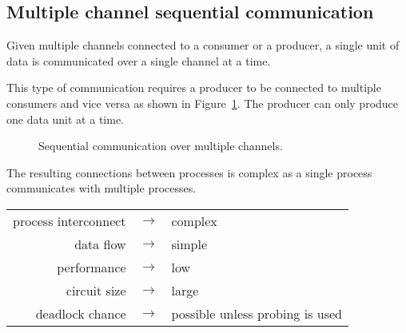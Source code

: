 \documentclass{report}
\begin{document}

\subsection{Multiple channel sequential communication}

Given multiple channels connected to a consumer or a producer, a single unit of
data is communicated over a single channel at a time.

This type of communication requires a producer to be connected to multiple
consumers and vice versa as shown in
Figure~\ref{fig:multi-channel-communication}. The producer can only produce one
data unit at a time.

\begin{figure}[H]
\centering
{}
\caption{Sequential communication over multiple channels.}\label{fig:multi-channel-communication}
\end{figure}

The resulting connections between processes is complex as a single process
communicates with multiple processes.

\begin{table}[H]
    \centering
    \begin{tabular}{r c l}
        process interconnect & $\rightarrow$ & complex \\
        data flow            & $\rightarrow$ & simple \\
        performance          & $\rightarrow$ & low \\
        circuit size         & $\rightarrow$ & large \\
        deadlock chance      & $\rightarrow$ & possible unless probing is used \\
    \end{tabular}
\end{table}
\end{document}
